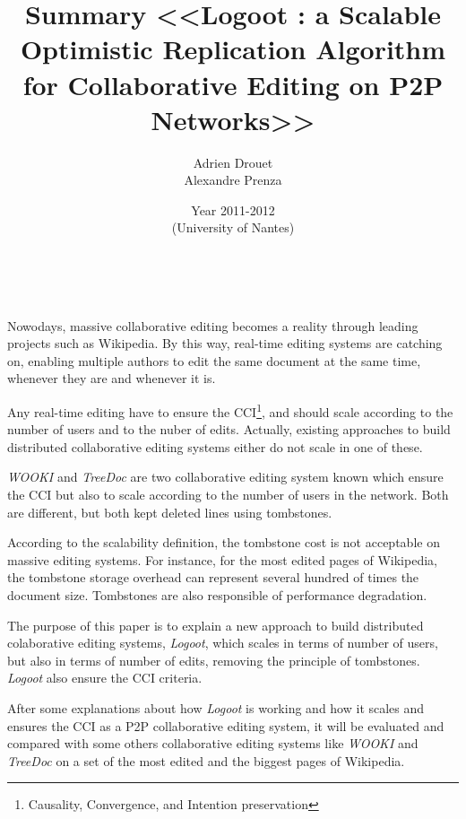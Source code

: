 \documentclass[11pt, a4paper]{article}
\title{ Summary
       <<Logoot : a Scalable Optimistic Replication Algorithm for Collaborative Editing on P2P Networks>>}
\author{Adrien Drouet\\Alexandre Prenza}
\date{Year 2011-2012\\
      (University of Nantes)}
\renewcommand{\headrulewidth}{0pt}
\renewcommand{\footrulewidth}{0pt}
\begin{document}
  \maketitle

  ~\newline
  \renewcommand{\footrulewidth}{0.4pt}
  \pagestyle{fancy}
  \newpage

 Nowodays, massive collaborative editing becomes a reality through leading projects such as Wikipedia. By this way, real-time editing systems are catching on, enabling multiple authors to edit the same document at the same time, whenever they are and whenever it is.
 
 Any real-time editing have to ensure the CCI\footnote{Causality, Convergence, and Intention preservation}, and should scale according to the number of users and to the nuber of edits. Actually, existing approaches to build distributed collaborative editing systems either do not scale in one of these.  
 
 \emph{WOOKI} and \emph{TreeDoc} are two collaborative editing system known which ensure the CCI but also to scale according to the number of users in the network. Both are different, but both kept deleted lines using tombstones. 
 
 According to the scalability definition, the tombstone cost is not acceptable on massive editing systems. For instance, for the most edited pages of Wikipedia, the tombstone storage overhead can represent several hundred of times the document size. Tombstones are also responsible of performance degradation.
 
 The purpose of this paper is to explain a new approach to build distributed colaborative editing systems, \emph{Logoot}, which scales in terms of number of users, but also in terms of number of edits, removing the principle of tombstones. \emph{Logoot} also ensure the CCI criteria.
 
 After some explanations about how \emph{Logoot} is working and how it scales and ensures the CCI as a P2P collaborative editing system, it will be evaluated and compared with some others collaborative editing systems like \emph{WOOKI} and \emph{TreeDoc} on a set of the most edited and the biggest pages of Wikipedia.
\end{document}

